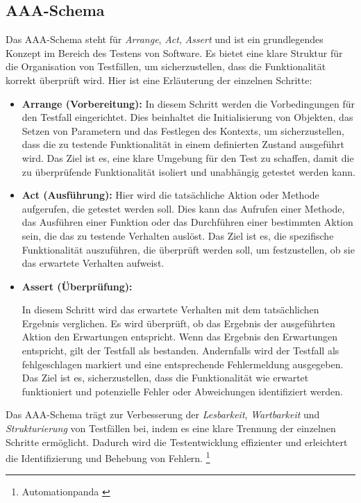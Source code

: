 \subsection{\label{sec:AAA} AAA-Schema}
Das AAA-Schema steht für \textit{Arrange}, \textit{Act}, \textit{Assert} und ist ein grundlegendes Konzept im Bereich des Testens von Software. Es bietet eine klare Struktur für die Organisation von Testfällen, um sicherzustellen, dass die Funktionalität korrekt überprüft wird. Hier ist eine Erläuterung der einzelnen Schritte:
\begin{itemize}
\item \textbf{Arrange (Vorbereitung):} In diesem Schritt werden die Vorbedingungen für den Testfall eingerichtet.
Dies beinhaltet die Initialisierung von Objekten, das Setzen von Parametern und das Festlegen des Kontexts, um sicherzustellen, dass die zu testende Funktionalität in einem definierten Zustand ausgeführt wird.
Das Ziel ist es, eine klare Umgebung für den Test zu schaffen, damit die zu überprüfende Funktionalität isoliert und unabhängig getestet werden kann.
\item \textbf{Act (Ausführung):}
Hier wird die tatsächliche Aktion oder Methode aufgerufen, die getestet werden soll.
Dies kann das Aufrufen einer Methode, das Ausführen einer Funktion oder das Durchführen einer bestimmten Aktion sein, die das zu testende Verhalten auslöst.
Das Ziel ist es, die spezifische Funktionalität auszuführen, die überprüft werden soll, um festzustellen, ob sie das erwartete Verhalten aufweist.
\item \textbf{Assert (Überprüfung):}

In diesem Schritt wird das erwartete Verhalten mit dem tatsächlichen Ergebnis verglichen.
Es wird überprüft, ob das Ergebnis der ausgeführten Aktion den Erwartungen entspricht.
Wenn das Ergebnis den Erwartungen entspricht, gilt der Testfall als bestanden. Andernfalls wird der Testfall als fehlgeschlagen markiert und eine entsprechende Fehlermeldung ausgegeben.
Das Ziel ist es, sicherzustellen, dass die Funktionalität wie erwartet funktioniert und potenzielle Fehler oder Abweichungen identifiziert werden.
\end{itemize}

Das AAA-Schema trägt zur Verbesserung der \textit{Lesbarkeit}, \textit{Wartbarkeit} und \textit{Strukturierung} von Testfällen bei, indem es eine klare Trennung der einzelnen Schritte ermöglicht. Dadurch wird die Testentwicklung effizienter und erleichtert die Identifizierung und Behebung von
Fehlern. \footnote{Automationpanda \cite{Arrange Act Assert}}

